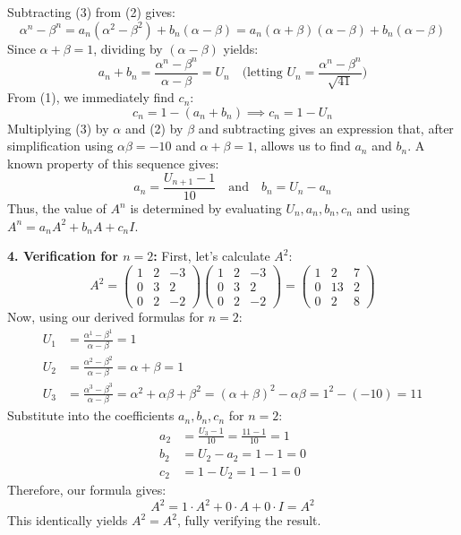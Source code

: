 \documentclass[12pt,a3paper]{article}
\begin{document}
\begin{tcolorbox}[enhanced,breakable,
  colback=cE!4,colframe=cE,boxrule=0.8pt,arc=5pt,
  title={\textbf{Answer --- Finding $A^n$ via Cayley-Hamilton Theorem}},
  fonttitle=\bfseries\color{white},colbacktitle=cE]
Subtracting (3) from (2) gives:
\[
\alpha^n - \beta^n = a_n(\alpha^2 - \beta^2) + b_n(\alpha - \beta) = a_n(\alpha+\beta)(\alpha-\beta) + b_n(\alpha-\beta)
\]
Since $\alpha+\beta=1$, dividing by $(\alpha-\beta)$ yields:
\[
a_n + b_n = \frac{\alpha^n - \beta^n}{\alpha - \beta} = U_n \quad \text{(letting $U_n = \frac{\alpha^n - \beta^n}{\sqrt{41}}$)}
\]
From (1), we immediately find $c_n$:
\[
c_n = 1 - (a_n + b_n) \implies \boxed{c_n = 1 - U_n}
\]
Multiplying (3) by $\alpha$ and (2) by $\beta$ and subtracting gives an expression that, after simplification using $\alpha\beta = -10$ and $\alpha+\beta=1$, allows us to find $a_n$ and $b_n$. A known property of this sequence gives:
\[
\boxed{a_n = \frac{U_{n+1} - 1}{10}} \quad \text{and} \quad \boxed{b_n = U_n - a_n}
\]
Thus, the value of $A^n$ is determined by evaluating $U_n, a_n, b_n, c_n$ and using $A^n = a_n A^2 + b_n A + c_n I$.

\vspace{0.5cm}
\textbf{4. Verification for $n = 2$:}
First, let's calculate $A^2$:
\[
A^2 = \begin{pmatrix} 1 & 2 & -3 \\ 0 & 3 & 2 \\ 0 & 2 & -2 \end{pmatrix} \begin{pmatrix} 1 & 2 & -3 \\ 0 & 3 & 2 \\ 0 & 2 & -2 \end{pmatrix} = \begin{pmatrix} 1 & 2 & 7 \\ 0 & 13 & 2 \\ 0 & 2 & 8 \end{pmatrix}
\]
Now, using our derived formulas for $n=2$:
\begin{align*}
U_1 &= \frac{\alpha^1 - \beta^1}{\alpha-\beta} = 1 \\
U_2 &= \frac{\alpha^2 - \beta^2}{\alpha-\beta} = \alpha + \beta = 1 \\
U_3 &= \frac{\alpha^3 - \beta^3}{\alpha-\beta} = \alpha^2 + \alpha\beta + \beta^2 = (\alpha+\beta)^2 - \alpha\beta = 1^2 - (-10) = 11
\end{align*}
Substitute into the coefficients $a_n, b_n, c_n$ for $n=2$:
\begin{align*}
a_2 &= \frac{U_3 - 1}{10} = \frac{11 - 1}{10} = 1 \\
b_2 &= U_2 - a_2 = 1 - 1 = 0 \\
c_2 &= 1 - U_2 = 1 - 1 = 0
\end{align*}
Therefore, our formula gives:
\[
A^2 = 1 \cdot A^2 + 0 \cdot A + 0 \cdot I = A^2
\]
This identically yields $A^2 = A^2$, fully verifying the result. \checkmark

\end{tcolorbox}
\end{document}
